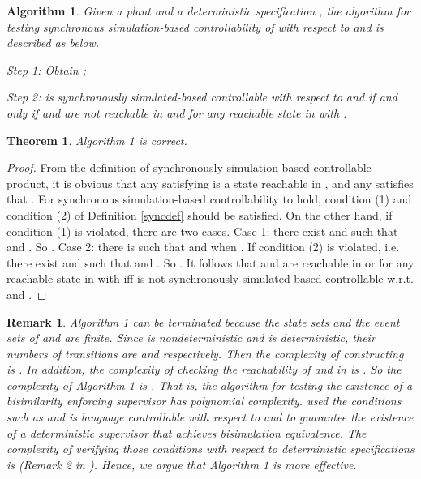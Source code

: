 \documentclass[preprint,authoryear,12pt]{elsarticle}
\newtheorem{Theorem}{Theorem}
\newtheorem{Remark}{Remark}
\newtheorem{Algorithm}{Algorithm}
\begin{document}
\begin{Algorithm}\label{algsync}
Given a plant  and a deterministic specification , the
algorithm for testing synchronous simulation-based controllability
of  with respect to  and  is described as
below.

Step 1: Obtain ;

Step 2:  is synchronously simulated-based controllable with
respect to  and  if and only if  and 
are not reachable in  and  for any
reachable state  in  with .
\end{Algorithm}



\begin{Theorem}\label{alg1c}
Algorithm 1 is correct.
\end{Theorem}
\begin{proof}
From the definition of synchronously simulation-based controllable
product, it is obvious that any  satisfying  is a state reachable in , and any  satisfies that . For synchronous simulation-based controllability to
hold, condition (1) and condition (2) of Definition \ref{syncdef}
should be satisfied. On the other hand, if condition (1) is
violated, there are two cases. Case 1: there exist  and
 such that  and . So . Case 2: there is  such that 
and  when . If condition (2) is
violated, i.e. there exist  and 
such that  and . So . It follows that  and  are reachable in
 or  for any reachable state  in  with  iff  is not
synchronously simulated-based controllable w.r.t.  and
.
\end{proof}


\begin{Remark}
Algorithm 1 can be terminated because the state sets and the event
sets of  and  are finite. Since  is nondeterministic and
 is deterministic, their numbers of transitions are  and  respectively. Then the complexity
of constructing  is . In
addition, the complexity of checking the reachability of  and
 in  is 
\citep{jones1975space}. So the complexity of Algorithm 1 is
. That is, the algorithm for testing
the existence of a bisimilarity enforcing supervisor has
polynomial complexity. \cite{zhoubisimilarity2011} used the
conditions such as  and  is language
controllable with respect to  and  to guarantee
the existence of a deterministic supervisor that achieves
bisimulation equivalence. The complexity of verifying those
conditions with respect to deterministic specifications is
 (Remark 2 in
\citep{zhoubisimilarity2011}). Hence, we argue that Algorithm 1 is
more effective.
\end{Remark}
\end{document}
